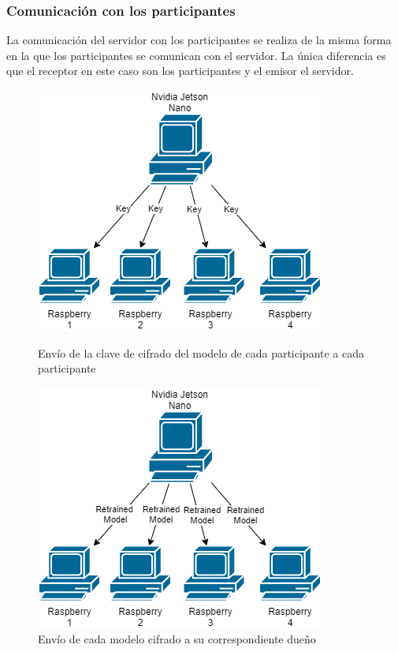 \subsubsection{Comunicación con los participantes}
La comunicación del servidor con los participantes se realiza de la misma forma en la que los participantes se comunican con el servidor. La única diferencia es que el receptor en este caso son los participantes y el emisor el servidor.
\begin{figure}[H]
    \begin{minipage}[t]{0.45\linewidth}  %
        \centering
        \includegraphics[width=\textwidth]{Figuras/Network_node_encrypted_key.png}
        \caption{Envío de la clave de cifrado del modelo de cada participante a cada participante} 
    \end{minipage}
    \hfill
    \begin{minipage}[t]{0.45\linewidth}  %
        \centering
        \includegraphics[width=\textwidth]{Figuras/Network_node_encrypted_model.png}    
        \caption{Envío de cada modelo cifrado a su correspondiente dueño} 
    \end{minipage}
\end{figure}
